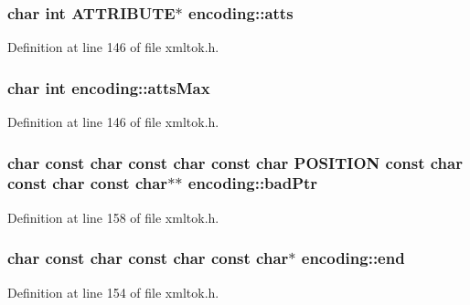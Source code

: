 \subsubsection[{\texorpdfstring{atts}{atts}}]{ char {\bf int} {\bf A\+T\+T\+R\+I\+B\+U\+TE}$\ast$ encoding\+::atts}\hypertarget{structencoding_a6f0f8a65c19c1b03bfe8b298bdb419ec}{}\label{structencoding_a6f0f8a65c19c1b03bfe8b298bdb419ec}


Definition at line 146 of file xmltok.\+h.

\subsubsection[{\texorpdfstring{atts\+Max}{attsMax}}]{ char {\bf int} encoding\+::atts\+Max}\hypertarget{structencoding_a7b42e4a6bc0c0969004a6644d01784f2}{}\label{structencoding_a7b42e4a6bc0c0969004a6644d01784f2}


Definition at line 146 of file xmltok.\+h.

\subsubsection[{\texorpdfstring{bad\+Ptr}{badPtr}}]{ char {\bf const} char {\bf const} char {\bf const} char {\bf P\+O\+S\+I\+T\+I\+ON} {\bf const} char {\bf const} char {\bf const} char$\ast$$\ast$ encoding\+::bad\+Ptr}\hypertarget{structencoding_a3842477d4481d822ee608c01b1d99e16}{}\label{structencoding_a3842477d4481d822ee608c01b1d99e16}


Definition at line 158 of file xmltok.\+h.

\subsubsection[{\texorpdfstring{end}{end}}]{ char {\bf const} char {\bf const} char {\bf const} char$\ast$ encoding\+::end}\hypertarget{structencoding_ac4aa42001aee7a5583395c922a0d50f5}{}\label{structencoding_ac4aa42001aee7a5583395c922a0d50f5}


Definition at line 154 of file xmltok.\+h.

